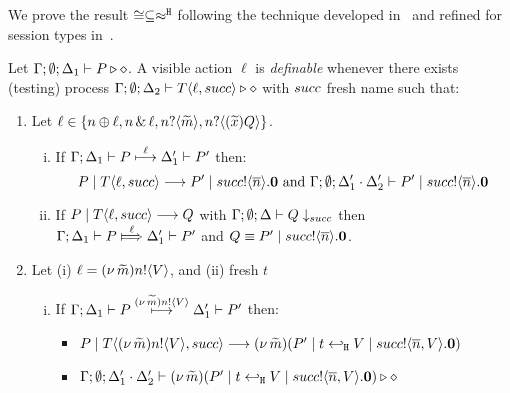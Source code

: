 We prove the result $\cong \subseteq \approx^\mathtt{H}$ following
the technique developed in~\cite{Hennessy07} and
refined for session types in~\cite{KYHH2015,KY2015}.


\begin{definition}[Definability]\myrm
	\label{app:def:definibility}
	Let $\Gamma; \emptyset; \Delta_1 \vdash P \triangleright \diamond$.
	A visible action $\ell$ is \emph{definable} whenever
	there exists (testing) process
	$\Gamma; \emptyset; \Delta_2 \vdash T\langle \ell, succ \rangle \triangleright \diamond$
	with $succ$ fresh name %
	such that:
%
	\begin{enumerate}
		\item	Let $\ell \in \{n \oplus \ell, n \,\&\, \ell, n ? \langle \widetilde{m} \rangle, n ? \langle (\widetilde{x}) Q \rangle\}$.
		
			\begin{enumerate}[i.]
				\item	If $\Gamma; \Delta_1 \vdash P \stackrel{\ell}{\longmapsto} \Delta_1' \vdash P'$
						then:
						\[
							P \;|\; T\langle \ell, succ \rangle \longrightarrow P' \;|\; succ ! \langle \overline{n} \rangle . \mathbf{0} \textrm{ and }
							\Gamma; \emptyset; \Delta_1' \cdot \Delta_2' \vdash P' \;|\; succ ! \langle \overline{n} \rangle . \mathbf{0}
						\]

				\item
						If $P \;|\; T\langle \ell, succ \rangle \longrightarrow Q$ with			
						$\Gamma; \emptyset; \Delta \vdash Q \downarrow_{succ}$ then \\
						$\horel{\Gamma}{\Delta_1}{P}{\Hby{\ell}}{\Delta_1'}{P'}$
						and $Q \equiv P' \;|\; succ ! \langle \overline{n} \rangle . \mathbf{0}$.
			\end{enumerate}
%
 		\item Let	(i) $\ell = (\nu\, \widetilde{m})n ! \langle V \rangle$,
					and (ii) fresh $t$%

			\begin{enumerate}[i.]
				\item	If $\Gamma; \Delta_1 \vdash P \stackrel{(\nu\, \widetilde{m})n ! \langle V \rangle}{\longmapsto} \Delta_1' \vdash P'$
						then:
%
						\begin{itemize}
							\item $P \;|\; T\langle (\nu\, \widetilde{m})n ! \langle V \rangle, succ \rangle \longrightarrow
							(\nu\, \widetilde{m})(P' \;|\; t \hookleftarrow_{\mathtt{H}} V \;|\; succ ! \langle \overline{n}, V \rangle . \mathbf{0})$
							\item $\Gamma; \emptyset; \Delta_1' \cdot \Delta_2' \vdash
							(\nu\, \widetilde{m})(P' \;|\; t \hookleftarrow_{\mathtt{H}} V \;|\;  succ ! \langle \overline{n}, V \rangle . \mathbf{0}) \triangleright \diamond$
						\end{itemize}


\end{enumerate}
\end{enumerate}
\end{definition}
